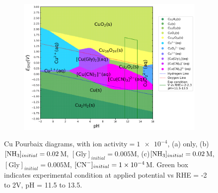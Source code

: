 \documentclass[journal=jacsat,manuscript=article]{achemso}
\begin{document}
\begin{figure}[htbp]
\begin{subfigure}[b]{0.3\textwidth}
    \end{subfigure}
    \begin{subfigure}[b]{0.3\textwidth}
        \subcaption{}\label{fig:Cu_Pourbaix_NH3_Gly_CN}
        \includegraphics[width=\textwidth]{Figures/pourbaix_diagrams/Cu-NH3-H2O_activity=1e-04_[NH3]=0.02M_[Gly]=0.005M_[CN]=0.0001.png}
        \par\medskip   
    \end{subfigure}
    \caption{Cu Pourbaix diagrams, with $\text{ion activity}=\num{1e-4}$, (a) only, (b)$[\ce{NH3}]_{initial}= 0.02$M, $[\text{Gly}]_{initial}=0.005$M, (c)$[\ce{NH3}]_{initial}= 0.02$M, $[\text{Gly}]_{initial}=0.005$M,  $[\ce{CN-}]_{initial}=\num{1e-4}$M. Green box indicates experimental condition at applied potential vs RHE = -2 to 2V, pH = 11.5 to 13.5.}
    \label{fig:Cu_Pourbaix}
\end{figure}
\end{document}
